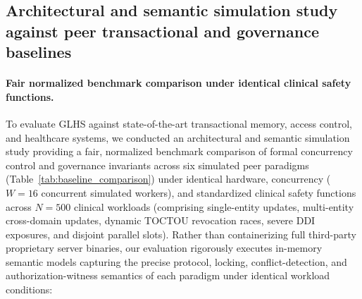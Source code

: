 \documentclass[11pt]{article}
\begin{document}
\subsection{Architectural and semantic simulation study against peer transactional and governance baselines}
\paragraph{Fair normalized benchmark comparison under identical clinical safety functions.}
To evaluate GLHS against state-of-the-art transactional memory, access control, and healthcare systems, we conducted an architectural and semantic simulation study providing a fair, normalized benchmark comparison of formal concurrency control and governance invariants across six simulated peer paradigms (Table~\ref{tab:baseline_comparison}) under identical hardware, concurrency ($W=16$ concurrent simulated workers), and standardized clinical safety functions across $N=500$ clinical workloads (comprising single-entity updates, multi-entity cross-domain updates, dynamic TOCTOU revocation races, severe DDI exposures, and disjoint parallel slots). Rather than containerizing full third-party proprietary server binaries, our evaluation rigorously executes in-memory semantic models capturing the precise protocol, locking, conflict-detection, and authorization-witness semantics of each paradigm under identical workload conditions:
\end{document}
